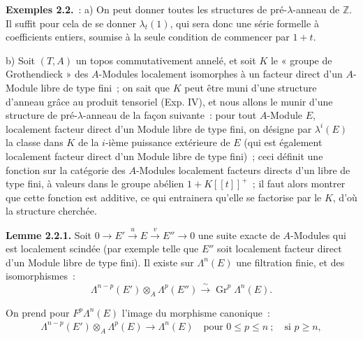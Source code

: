 \textbf{Exemples 2.2.}~: a) On peut donner toutes les structures de pré-\(\lambda\)-anneau de \(\mathbb Z\). Il suffit pour cela de se donner \(\lambda_t(1)\), qui sera donc une série formelle à coefficients entiers, soumise à la seule condition de commencer par \(1+t\).

b) Soit \((T,A)\) un topos commutativement annelé, et soit \(K\) le « groupe de Grothendieck » des \(A\)-Modules localement isomorphes à un facteur direct d'un \(A\)-Module libre de type fini~; on sait que \(K\) peut être muni d'une structure d'anneau grâce au produit tensoriel (Exp. IV), et nous allons le munir d'une structure de pré-\(\lambda\)-anneau de la façon suivante~: pour tout \(A\)-Module \(E\), localement facteur direct d'un Module libre de type fini, on désigne par \(\lambda^i(E)\) la classe dans \(K\) de la \(i\)-ième puissance extérieure de \(E\) (qui est également localement facteur direct d'un Module libre de type fini)~; ceci définit une fonction sur la catégorie des \(A\)-Modules localement facteurs directs d'un libre de type fini, à valeurs dans le groupe abélien \(1+K[[t]]^+\)~; il faut alors montrer que cette fonction est additive, ce qui entrainera qu'elle se factorise par le \(K\), d'où la structure cherchée.

\textbf{Lemme 2.2.1.} Soit \(0\longrightarrow E' \xrightarrow{u} E \xrightarrow{v} E''\longrightarrow0\) une suite exacte de \(A\)-Modules qui est localement scindée (par exemple telle que \(E''\) soit localement facteur direct d'un Module libre de type fini). Il existe sur \(\Lambda^n(E)\) une filtration finie, et des isomorphismes~:
\[
  \Lambda^{n-p}(E')\otimes_A\Lambda^p(E'')
  \xrightarrow{\sim}
  \operatorname{Gr}^p\Lambda^n(E).
\]

On prend pour \(F^p\Lambda^n(E)\) l'image du morphisme canonique~:
\[
\begin{gathered}
  \Lambda^{n-p}(E')\otimes_A\Lambda^p(E)\longrightarrow\Lambda^n(E)
  \quad\text{pour } 0\leq p\leq n\ ;\quad \text{si } p\geq n,
\end{gathered}
\]
